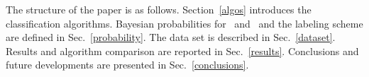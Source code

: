 The structure of the paper is as follows. Section~\ref{algos} introduces the classification algorithms. Bayesian probabilities for \hasns\ and \hasrem\ and the labeling scheme are defined in
Sec.~\ref{probability}. The data set is described in Sec.~\ref{dataset}. Results and algorithm comparison are reported in Sec.~\ref{results}. Conclusions and future developments are presented in Sec.~\ref{conclusions}.  
